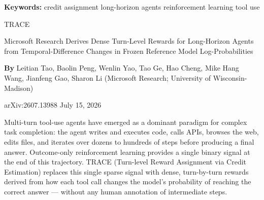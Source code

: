 \documentclass[10pt,twocolumn]{article}
\begin{document}
\setlength{\parindent}{0pt}
\setlength{\parskip}{4pt}

{\small\color{keywordgray}\textbf{Keywords:}
  credit assignment \textbullet{}
  long-horizon agents \textbullet{}
  reinforcement learning \textbullet{}
  tool use}\par\vspace{4pt}

{\LARGE\bfseries\raggedright
  TRACE}\par\vspace{4pt}

{\large\itshape\raggedright
  Microsoft Research Derives Dense Turn-Level Rewards for
  Long-Horizon Agents from Temporal-Difference Changes in
  Frozen Reference Model Log-Probabilities}\par\vspace{6pt}

{\small\textbf{By} Leitian Tao, Baolin Peng, Wenlin Yao, Tao Ge,
  Hao Cheng, Mike Hang Wang, Jianfeng Gao, Sharon Li
  (Microsoft Research; University of Wisconsin-Madison)}\par\vspace{2pt}

{\small\color{keywordgray}arXiv:2607.13988 \textbullet{}
  July 15, 2026}
\par\vspace{2pt}\noindent{\color{rulered}\rule{\columnwidth}{0.6pt}}\vspace{6pt}

Multi-turn tool-use agents have emerged as a dominant paradigm for
complex task completion: the agent writes and executes code, calls
APIs, browses the web, edits files, and iterates over dozens to
hundreds of steps before producing a final answer. Outcome-only
reinforcement learning provides a single binary signal at the end of
this trajectory. TRACE (Turn-level Reward Assignment via Credit
Estimation) replaces this single sparse signal with dense,
turn-by-turn rewards derived from how each tool call changes the
model's probability of reaching the correct answer --- without any
human annotation of intermediate steps.
\end{document}
